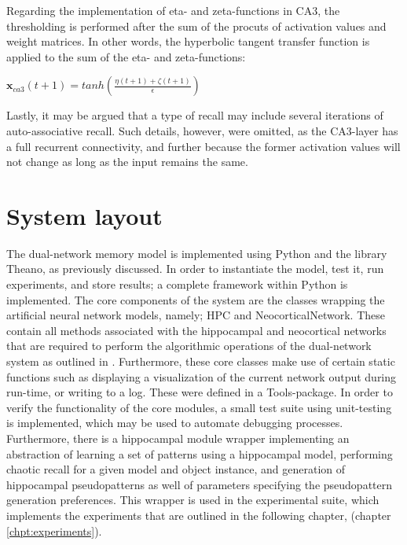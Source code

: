Regarding the implementation of eta- and zeta-functions in CA3, the thresholding is performed after the sum of the procuts of activation values and weight matrices. In other words, the hyperbolic tangent transfer function is applied to the sum of the eta- and zeta-functions: 

\begin{center}
\begin{math}
    \textbf{x}_{ca3}(t+1) = tanh(\frac{\eta(t+1) + \zeta(t+1)}{\epsilon})
\end{math}
\end{center}

Lastly, it may be argued that a type of recall may include several iterations of auto-associative recall. Such details, however, were omitted, as the CA3-layer has a full recurrent connectivity, and further because the former activation values will not change as long as the input remains the same.


\section{System layout}

The dual-network memory model is implemented using Python and the library Theano, as previously discussed. In order to instantiate the model, test it, run experiments, and store results; a complete framework within Python is implemented. The core components of the system are the classes wrapping the artificial neural network models, namely; HPC and NeocorticalNetwork. These contain all methods associated with the hippocampal and neocortical networks that are required to perform the algorithmic operations of the dual-network system as outlined in \citep{Hattori2014}. Furthermore, these core classes make use of certain static functions such as displaying a visualization of the current network output during run-time, or writing to a log. These were defined in a Tools-package. In order to verify the functionality of the core modules, a small test suite using unit-testing is implemented, which may be used to automate debugging processes. 
Furthermore, there is a hippocampal module wrapper implementing an abstraction of learning a set of patterns using a hippocampal model, performing chaotic recall for a given model and object instance, and generation of hippocampal pseudopatterns as well of parameters specifying the pseudopattern generation preferences. This wrapper is used in the experimental suite, which implements the experiments that are outlined in the following chapter, (chapter \ref{chpt:experiments}). 

